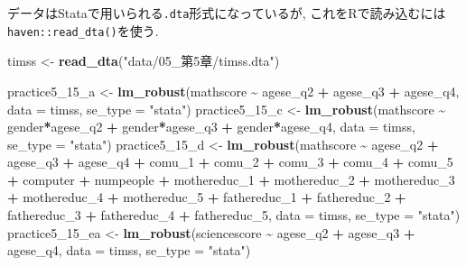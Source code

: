 \documentclass[
]{book}
\newenvironment{Shaded}{\begin{snugshade}}{\end{snugshade}}
\newcommand{\AttributeTok}[1]{\textcolor[rgb]{0.13,0.29,0.53}{#1}}
\newcommand{\FunctionTok}[1]{\textcolor[rgb]{0.13,0.29,0.53}{\textbf{#1}}}
\newcommand{\NormalTok}[1]{#1}
\newcommand{\OtherTok}[1]{\textcolor[rgb]{0.56,0.35,0.01}{#1}}
\newcommand{\SpecialCharTok}[1]{\textcolor[rgb]{0.81,0.36,0.00}{\textbf{#1}}}
\newcommand{\StringTok}[1]{\textcolor[rgb]{0.31,0.60,0.02}{#1}}
\begin{document}
データはStataで用いられる\texttt{.dta}形式になっているが, これをRで読み込むには\texttt{haven::read\_dta()}を使う.

\begin{Shaded}
\begin{Highlighting}[]
\NormalTok{timss }\OtherTok{\textless{}{-}} \FunctionTok{read\_dta}\NormalTok{(}\StringTok{"data/05\_第5章/timss.dta"}\NormalTok{)}

\NormalTok{practice5\_15\_a }\OtherTok{\textless{}{-}} \FunctionTok{lm\_robust}\NormalTok{(mathscore }\SpecialCharTok{\textasciitilde{}}\NormalTok{ agese\_q2 }\SpecialCharTok{+}\NormalTok{ agese\_q3 }\SpecialCharTok{+}\NormalTok{ agese\_q4, }\AttributeTok{data =}\NormalTok{ timss, }\AttributeTok{se\_type =} \StringTok{"stata"}\NormalTok{)}
\NormalTok{practice5\_15\_c }\OtherTok{\textless{}{-}} \FunctionTok{lm\_robust}\NormalTok{(mathscore }\SpecialCharTok{\textasciitilde{}}\NormalTok{ gender}\SpecialCharTok{*}\NormalTok{agese\_q2 }\SpecialCharTok{+}\NormalTok{ gender}\SpecialCharTok{*}\NormalTok{agese\_q3 }\SpecialCharTok{+}\NormalTok{ gender}\SpecialCharTok{*}\NormalTok{agese\_q4, }\AttributeTok{data =}\NormalTok{ timss, }\AttributeTok{se\_type =} \StringTok{"stata"}\NormalTok{)}
\NormalTok{practice5\_15\_d }\OtherTok{\textless{}{-}} \FunctionTok{lm\_robust}\NormalTok{(mathscore }\SpecialCharTok{\textasciitilde{}}\NormalTok{ agese\_q2 }\SpecialCharTok{+}\NormalTok{ agese\_q3 }\SpecialCharTok{+}\NormalTok{ agese\_q4 }\SpecialCharTok{+}\NormalTok{ comu\_1 }\SpecialCharTok{+}\NormalTok{ comu\_2 }\SpecialCharTok{+}\NormalTok{ comu\_3 }\SpecialCharTok{+}\NormalTok{ comu\_4 }\SpecialCharTok{+}\NormalTok{ comu\_5 }\SpecialCharTok{+}\NormalTok{ computer }\SpecialCharTok{+}\NormalTok{ numpeople }\SpecialCharTok{+}\NormalTok{ mothereduc\_1 }\SpecialCharTok{+}\NormalTok{ mothereduc\_2 }\SpecialCharTok{+}\NormalTok{ mothereduc\_3 }\SpecialCharTok{+}\NormalTok{ mothereduc\_4 }\SpecialCharTok{+}\NormalTok{ mothereduc\_5 }\SpecialCharTok{+}\NormalTok{ fathereduc\_1 }\SpecialCharTok{+}\NormalTok{ fathereduc\_2 }\SpecialCharTok{+}\NormalTok{ fathereduc\_3 }\SpecialCharTok{+}\NormalTok{ fathereduc\_4 }\SpecialCharTok{+}\NormalTok{ fathereduc\_5, }\AttributeTok{data =}\NormalTok{ timss, }\AttributeTok{se\_type =} \StringTok{"stata"}\NormalTok{)}
\NormalTok{practice5\_15\_ea }\OtherTok{\textless{}{-}} \FunctionTok{lm\_robust}\NormalTok{(sciencescore }\SpecialCharTok{\textasciitilde{}}\NormalTok{ agese\_q2 }\SpecialCharTok{+}\NormalTok{ agese\_q3 }\SpecialCharTok{+}\NormalTok{ agese\_q4, }\AttributeTok{data =}\NormalTok{ timss, }\AttributeTok{se\_type =} \StringTok{"stata"}\NormalTok{)}

\end{Highlighting}
\end{Shaded}
\end{document}
